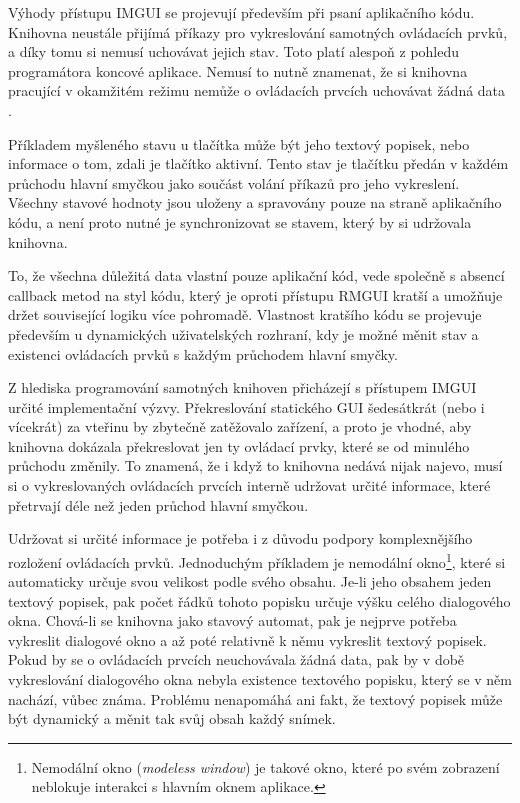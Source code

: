 \documentclass[FM,DP]{tulthesis}
\begin{document}
	Výhody přístupu IMGUI se projevují především při psaní aplikačního kódu. Knihovna neustále přijímá příkazy pro vykreslování samotných ovládacích prvků, a díky tomu si nemusí uchovávat jejich stav. Toto platí alespoň z pohledu programátora koncové aplikace. Nemusí to nutně znamenat, že si knihovna pracující v okamžitém režimu nemůže o ovládacích prvcích uchovávat žádná data \cite{online_imguiwiki}.
	
	Příkladem myšleného stavu u tlačítka může být jeho textový popisek, nebo informace o tom, zdali je tlačítko aktivní. Tento stav je tlačítku předán v každém průchodu hlavní smyčkou jako součást volání příkazů pro jeho vykreslení. Všechny stavové hodnoty jsou uloženy a spravovány pouze na straně aplikačního kódu, a není proto nutné je synchronizovat se stavem, který by si udržovala knihovna.
	
	To, že všechna důležitá data vlastní pouze aplikační kód, vede společně s absencí callback metod na styl kódu, který je oproti přístupu RMGUI kratší a umožňuje držet související logiku více pohromadě. Vlastnost kratšího kódu se projevuje především u dynamických uživatelských rozhraní, kdy je možné měnit stav a existenci ovládacích prvků s každým průchodem hlavní smyčky.
	
	Z hlediska programování samotných knihoven přicházejí s přístupem IMGUI určité implementační výzvy. Překreslování statického GUI šedesátkrát (nebo i vícekrát) za vteřinu by zbytečně zatěžovalo zařízení, a proto je vhodné, aby knihovna dokázala překreslovat jen ty ovládací prvky, které se od minulého průchodu změnily. To znamená, že i když to knihovna nedává nijak najevo, musí si o vykreslovaných ovládacích prvcích interně udržovat určité informace, které přetrvají déle než jeden průchod hlavní smyčkou.
	
	Udržovat si určité informace je potřeba i z důvodu podpory komplexnějšího rozložení ovládacích prvků. Jednoduchým příkladem je nemodální okno\footnote{Nemodální okno (\textit{\mbox{modeless} window}) je takové okno, které po svém zobrazení neblokuje interakci s hlavním oknem aplikace.}, které si automaticky určuje svou velikost podle svého obsahu. Je-li jeho obsahem jeden textový popisek, pak počet řádků tohoto popisku určuje výšku celého dialogového okna. Chová-li se knihovna jako stavový automat, pak je nejprve potřeba vykreslit dialogové okno a až poté relativně k němu vykreslit textový popisek. Pokud by se o ovládacích prvcích neuchovávala žádná data, pak by v době vykreslování dialogového okna nebyla existence textového popisku, který se v něm nachází, vůbec známa. Problému nenapomáhá ani fakt, že textový popisek může být dynamický a měnit tak svůj obsah každý snímek.
	
\end{document}
